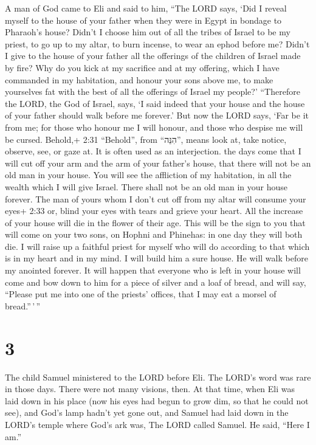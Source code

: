  A man of God came to Eli and said to him, ``The LORD says,
`Did I reveal myself to the house of your father when they were in Egypt
in bondage to Pharaoh's house?  Didn't I choose him out of
all the tribes of Israel to be my priest, to go up to my altar, to burn
incense, to wear an ephod before me? Didn't I give to the house of your
father all the offerings of the children of Israel made by fire?
 Why do you kick at my sacrifice and at my offering, which
I have commanded in my habitation, and honour your sons above me, to
make yourselves fat with the best of all the offerings of Israel my
people?'  ``Therefore the LORD, the God of Israel, says, `I
said indeed that your house and the house of your father should walk
before me forever.' But now the LORD says, `Far be it from me; for those
who honour me I will honour, and those who despise me will be cursed.
 Behold,+ 2:31 ``Behold'', from ``הִנֵּה'', means look at,
take notice, observe, see, or gaze at. It is often used as an
interjection. the days come that I will cut off your arm and the arm of
your father's house, that there will not be an old man in your house.
 You will see the affliction of my habitation, in all the
wealth which I will give Israel. There shall not be an old man in your
house forever.  The man of yours whom I don't cut off from
my altar will consume your eyes+ 2:33 or, blind your eyes with tears and
grieve your heart. All the increase of your house will die in the flower
of their age.  This will be the sign to you that will come
on your two sons, on Hophni and Phinehas: in one day they will both die.
 I will raise up a faithful priest for myself who will do
according to that which is in my heart and in my mind. I will build him
a sure house. He will walk before my anointed forever.  It
will happen that everyone who is left in your house will come and bow
down to him for a piece of silver and a loaf of bread, and will say,
``Please put me into one of the priests' offices, that I may eat a
morsel of bread.''\,'\,''

\hypertarget{section-2}{%
\section{3}\label{section-2}}

 The child Samuel ministered to the LORD before Eli. The
LORD's word was rare in those days. There were not many visions, then.
 At that time, when Eli was laid down in his place (now his
eyes had begun to grow dim, so that he could not see),  and
God's lamp hadn't yet gone out, and Samuel had laid down in the LORD's
temple where God's ark was,  The LORD called Samuel. He
said, ``Here I am.''

